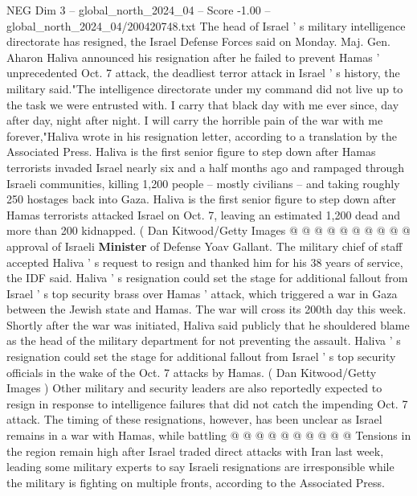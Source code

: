 \begin{textsample}{NEG Dim 3 – global\_north\_2024\_04 – Score -1.00 – global\_north\_2024\_04/200420748.txt}  \label{ex:f3_neg_381}
The head of Israel ' s military intelligence directorate has resigned, the Israel Defense Forces said on Monday.
Maj.
Gen.
Aharon Haliva announced his resignation after he failed to prevent Hamas ' unprecedented Oct. 7 attack, the deadliest terror attack in Israel ' s history, the military said."The intelligence directorate under my command did not live up to the task we were entrusted with.
I carry that black day with me ever since, day after day, night after night.
I will carry the horrible pain of the war with me forever,"Haliva wrote in his resignation letter, according to a translation by the Associated Press.
Haliva is the first senior figure to step down after Hamas terrorists invaded Israel nearly six and a half months ago and rampaged through Israeli communities, killing 1,200 people -- mostly civilians -- and taking roughly 250 hostages back into Gaza.
Haliva is the first senior figure to step down after Hamas terrorists attacked Israel on Oct. 7, leaving an estimated 1,200 dead and more than 200 kidnapped. ( Dan Kitwood/Getty Images @ @ @ @ @ @ @ @ @ @ approval of Israeli \textbf{Minister} of Defense Yoav Gallant.
The military chief of staff accepted Haliva ' s request to resign and thanked him for his 38 years of service, the IDF said.
Haliva ' s resignation could set the stage for additional fallout from Israel ' s top security brass over Hamas ' attack, which triggered a war in Gaza between the Jewish state and Hamas.
The war will cross its 200th day this week.
Shortly after the war was initiated, Haliva said publicly that he shouldered blame as the head of the military department for not preventing the assault.
Haliva ' s resignation could set the stage for additional fallout from Israel ' s top security officials in the wake of the Oct. 7 attacks by Hamas. ( Dan Kitwood/Getty Images ) Other military and security leaders are also reportedly expected to resign in response to intelligence failures that did not catch the impending Oct. 7 attack.
The timing of these resignations, however, has been unclear as Israel remains in a war with Hamas, while battling @ @ @ @ @ @ @ @ @ @ Tensions in the region remain high after Israel traded direct attacks with Iran last week, leading some military experts to say Israeli resignations are irresponsible while the military is fighting on multiple fronts, according to the Associated Press.

\end{textsample}
